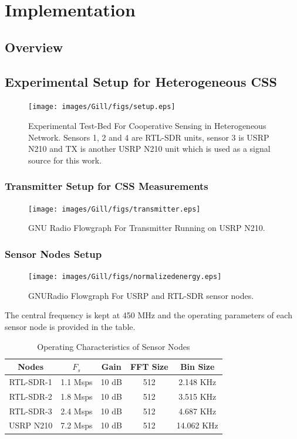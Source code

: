 \chapter{Implementation}
\label{chapter5}


\section{Overview}

\section{Experimental Setup for Heterogeneous CSS}

\begin{figure}[ht!]
	\centering
	\texttt{[image: images/Gill/figs/setup.eps]}
    \caption{Experimental Test-Bed For Cooperative Sensing in Heterogeneous Network. Sensors 1, 2 and 4 are RTL-SDR units, sensor 3 is USRP N210 and TX is another USRP N210 unit which is used as a signal source for this work.} 
\label{expsetup}      
\end{figure}

\subsection{Transmitter Setup for CSS Measurements}
\begin{figure}[ht!]
	\centering
	\texttt{[image: images/Gill/figs/transmitter.eps]}
    \caption{GNU Radio Flowgraph For Transmitter Running on USRP N210.} 
\label{transmitter}      
\end{figure}

\subsection{Sensor Nodes Setup}

\begin{figure}[ht!]
	\centering
	\texttt{[image: images/Gill/figs/normalizedenergy.eps]}
    \caption{GNURadio Flowgraph For USRP and RTL-SDR sensor nodes.} 
\label{receiver}      
\end{figure}

The central frequency is kept at 450 MHz and the operating parameters of each sensor node is provided in the table.
\begin{table}[!ht]
\caption{Operating Characteristics of Sensor Nodes}
\centering
\vspace{-5pt}
\begin{tabular}{|c | c | c | c | c|}
\hline
Nodes      & $F_s$     & Gain  & FFT Size &  Bin Size \\ \hline
RTL-SDR-1  & 1.1 Msps  & 10 dB & 512      & 2.148 KHz \\ \hline
RTL-SDR-2  & 1.8 Msps  & 10 dB & 512      & 3.515 KHz\\ \hline
RTL-SDR-3  & 2.4 Msps  & 10 dB & 512      & 4.687 KHz\\ \hline
USRP N210  & 7.2 Msps  & 10 dB & 512     &  14.062 KHz\\ 
\hline
\end{tabular}
\vspace{-5pt}
\label{table1}
\end{table}

